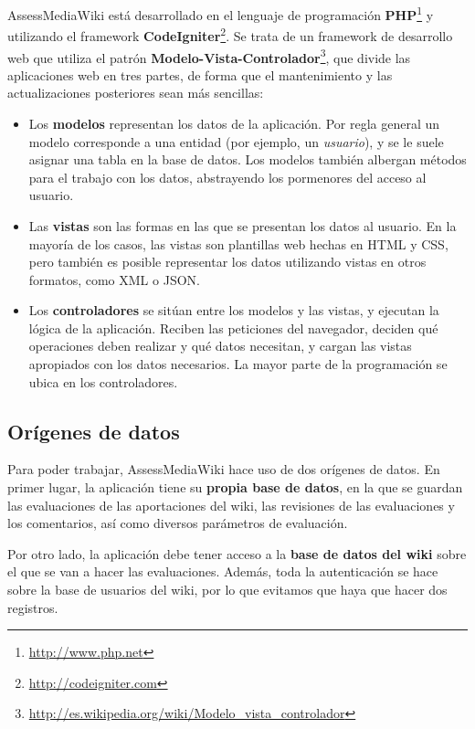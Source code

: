 \documentclass[11pt]{article}
\begin{document}
AssessMediaWiki está desarrollado en el lenguaje de programación
\textbf{PHP}\footnote{\url{http://www.php.net}} y utilizando el framework
\textbf{CodeIgniter}\footnote{\url{http://codeigniter.com}}. Se trata de un
framework de desarrollo web que utiliza el patrón
\textbf{Modelo-Vista-Controlador}\footnote{\url{http://es.wikipedia.org/wiki/Modelo_vista_controlador}},
que divide las aplicaciones web en tres partes, de forma que el mantenimiento y
las actualizaciones posteriores sean más sencillas:

\begin{itemize}
\item Los \textbf{modelos} representan los datos de la aplicación. Por regla
  general un modelo corresponde a una entidad (por ejemplo, un
  \textit{usuario}), y se le suele asignar una tabla en la base de datos. Los
  modelos también albergan métodos para el trabajo con los datos, abstrayendo
  los pormenores del acceso al usuario.
\item Las \textbf{vistas} son las formas en las que se presentan los datos al
  usuario. En la mayoría de los casos, las vistas son plantillas web hechas en
  HTML y CSS, pero también es posible representar los datos utilizando vistas en
  otros formatos, como XML o JSON.
\item Los \textbf{controladores} se sitúan entre los modelos y las vistas, y
  ejecutan la lógica de la aplicación. Reciben las peticiones del navegador,
  deciden qué operaciones deben realizar y qué datos necesitan, y cargan las
  vistas apropiados con los datos necesarios. La mayor parte de la programación
  se ubica en los controladores.
\end{itemize}

\subsection{Orígenes de datos}

Para poder trabajar, AssessMediaWiki hace uso de dos orígenes de datos. En
primer lugar, la aplicación tiene su \textbf{propia base de datos}, en la que se
guardan las evaluaciones de las aportaciones del wiki, las revisiones de las
evaluaciones y los comentarios, así como diversos parámetros de evaluación.

Por otro lado, la aplicación debe tener acceso a la \textbf{base de datos del
  wiki} sobre el que se van a hacer las evaluaciones. Además, toda la
autenticación se hace sobre la base de usuarios del wiki, por lo que evitamos
que haya que hacer dos registros.
\end{document}
